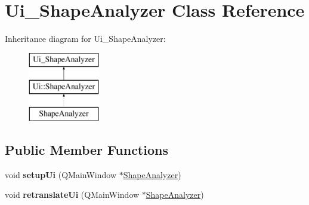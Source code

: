 \hypertarget{class_ui___shape_analyzer}{}\section{Ui\+\_\+\+Shape\+Analyzer Class Reference}
\label{class_ui___shape_analyzer}
Inheritance diagram for Ui\+\_\+\+Shape\+Analyzer\+:\begin{figure}[H]
\begin{center}
\leavevmode
\includegraphics[height=3.000000cm]{class_ui___shape_analyzer}
\end{center}
\end{figure}
\subsection*{Public Member Functions}
\begin{DoxyCompactItemize}
\item 
\hypertarget{class_ui___shape_analyzer_a5fbfb40369d4582c10358676baec26da}{}void {\bfseries setup\+Ui} (Q\+Main\+Window $\ast$\hyperlink{class_shape_analyzer}{Shape\+Analyzer})\label{class_ui___shape_analyzer_a5fbfb40369d4582c10358676baec26da}

\item 
\hypertarget{class_ui___shape_analyzer_a1685c951f77970371d969f80499be831}{}void {\bfseries retranslate\+Ui} (Q\+Main\+Window $\ast$\hyperlink{class_shape_analyzer}{Shape\+Analyzer})\label{class_ui___shape_analyzer_a1685c951f77970371d969f80499be831}

\end{DoxyCompactItemize}
